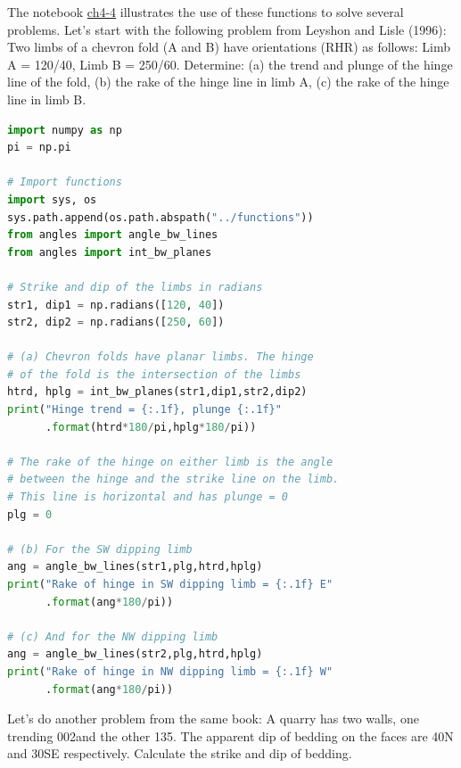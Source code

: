 \documentclass[a4paper , 12pt]{book}
\begin{document}
The notebook \href{https://github.com/nfcd/compGeo/blob/master/source/notebooks/ch4-4.ipynb}{ch4-4} illustrates the use of these functions to solve several problems. Let's start with the following problem from Leyshon and Lisle (1996): Two limbs of a chevron fold (A and B) have orientations (RHR) as follows: Limb A = 120/40, Limb B = 250/60. Determine: (a) the trend and plunge of the hinge line of the fold, (b) the rake of the hinge line in limb A, (c) the rake of the hinge line in limb B. 

\begin{center}
\begin{lstlisting}[language=Python, frame=single]
import numpy as np
pi = np.pi

# Import functions 
import sys, os
sys.path.append(os.path.abspath("../functions"))
from angles import angle_bw_lines
from angles import int_bw_planes

# Strike and dip of the limbs in radians
str1, dip1 = np.radians([120, 40])
str2, dip2 = np.radians([250, 60])

# (a) Chevron folds have planar limbs. The hinge
# of the fold is the intersection of the limbs
htrd, hplg = int_bw_planes(str1,dip1,str2,dip2)
print("Hinge trend = {:.1f}, plunge {:.1f}"
      .format(htrd*180/pi,hplg*180/pi))

# The rake of the hinge on either limb is the angle 
# between the hinge and the strike line on the limb. 
# This line is horizontal and has plunge = 0
plg = 0

# (b) For the SW dipping limb
ang = angle_bw_lines(str1,plg,htrd,hplg)
print("Rake of hinge in SW dipping limb = {:.1f} E"
      .format(ang*180/pi))

# (c) And for the NW dipping limb
ang = angle_bw_lines(str2,plg,htrd,hplg)
print("Rake of hinge in NW dipping limb = {:.1f} W"
      .format(ang*180/pi))
\end{lstlisting}
\end{center}

Let's do another problem from the same book: A quarry has two walls, one trending 002\degree\space and the other 135\degree. The apparent dip of bedding on the faces are 40\degree\space N and 30\degree\space SE respectively. Calculate the strike and dip of bedding.
\end{document}
